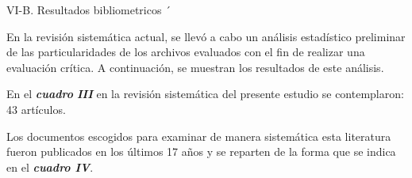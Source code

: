 \documentclass[conference]{IEEEtran}
\begin{document}
VI-B. Resultados bibliometricos ´

En la revisión sistemática actual, se llevó a cabo un análisis estadístico preliminar de las particularidades de los archivos evaluados con el fin de realizar una evaluación crítica. A continuación, se muestran los resultados de este análisis.

En el \textit{\textbf{cuadro }\textbf{III} }en la revisión sistemática del presente estudio se contemplaron: 43 artículos. 

Los documentos escogidos para examinar de manera sistemática esta literatura fueron publicados en los últimos 17 años y se reparten de la forma que se indica en el \textit{\textbf{cuadro IV}}.
\end{document}
